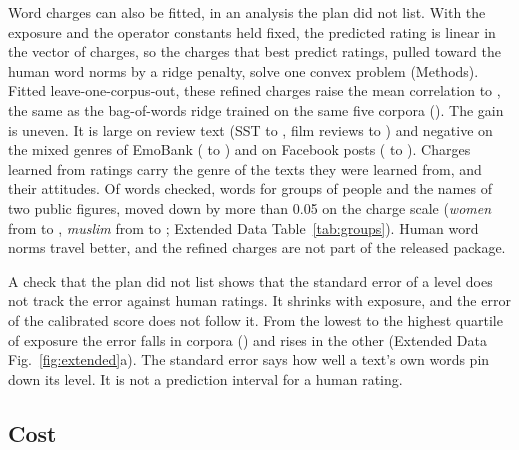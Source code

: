 Word charges can also be fitted, in an analysis the plan did not list. With the exposure and the operator constants held fixed, the predicted rating is linear in the vector of charges, so the charges that best predict ratings, pulled toward the human word norms by a ridge penalty, solve one convex problem (Methods). Fitted leave-one-corpus-out, these refined charges raise the mean correlation to \meanRefined, the same as the bag-of-words ridge trained on the same five corpora (\meanBowPool). The gain is uneven. It is large on review text (SST \rSgwSst{} to \rRefinedSst, film reviews \rSgwFilm{} to \rRefinedFilm) and negative on the mixed genres of EmoBank (\rSgwEmo{} to \rRefinedEmo) and on Facebook posts (\rSgwFb{} to \rRefinedFb). Charges learned from ratings carry the genre of the texts they were learned from, and their attitudes. Of \grpTerms{} words checked, words for groups of people and the names of two public figures, \grpDown{} moved down by more than 0.05 on the charge scale (\emph{women} from \grpWomenNorm{} to \grpWomenFit, \emph{muslim} from \grpMuslimNorm{} to \grpMuslimFit; Extended Data Table~\ref{tab:groups}). Human word norms travel better, and the refined charges are not part of the released package.

A check that the plan did not list shows that the standard error of a level does not track the error against human ratings. It shrinks with exposure, and the error of the calibrated score does not follow it. From the lowest to the highest quartile of exposure the error falls in \errFall{} corpora (\errFallNames) and rises in the other \errRise{} (Extended Data Fig.~\ref{fig:extended}a). The standard error says how well a text's own words pin down its level. It is not a prediction interval for a human rating.

\figAccuracy

\subsection{Cost}

